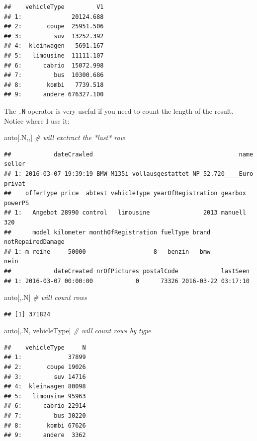 \documentclass[]{book}
\newenvironment{Shaded}{\begin{snugshade}}{\end{snugshade}}
\newcommand{\CommentTok}[1]{\textcolor[rgb]{0.56,0.35,0.01}{\textit{#1}}}
\newcommand{\NormalTok}[1]{#1}
\theoremstyle{definition}
\theoremstyle{definition}
\theoremstyle{definition}
\theoremstyle{remark}
\begin{document}
\begin{verbatim}
##    vehicleType         V1
## 1:              20124.688
## 2:       coupe  25951.506
## 3:         suv  13252.392
## 4:  kleinwagen   5691.167
## 5:   limousine  11111.107
## 6:      cabrio  15072.998
## 7:         bus  10300.686
## 8:       kombi   7739.518
## 9:      andere 676327.100
\end{verbatim}

The \texttt{.N} operator is very useful if you need to count the length of the result.
Notice where I use it:

\begin{Shaded}
\begin{Highlighting}[]
\NormalTok{auto[.N,,] }\CommentTok{# will exctract the *last* row}
\end{Highlighting}
\end{Shaded}

\begin{verbatim}
##            dateCrawled                                         name seller
## 1: 2016-03-07 19:39:19 BMW_M135i_vollausgestattet_NP_52.720____Euro privat
##    offerType price  abtest vehicleType yearOfRegistration gearbox powerPS
## 1:   Angebot 28990 control   limousine               2013 manuell     320
##      model kilometer monthOfRegistration fuelType brand notRepairedDamage
## 1: m_reihe     50000                   8   benzin   bmw              nein
##            dateCreated nrOfPictures postalCode            lastSeen
## 1: 2016-03-07 00:00:00            0      73326 2016-03-22 03:17:10
\end{verbatim}

\begin{Shaded}
\begin{Highlighting}[]
\NormalTok{auto[,.N] }\CommentTok{# will count rows}
\end{Highlighting}
\end{Shaded}

\begin{verbatim}
## [1] 371824
\end{verbatim}

\begin{Shaded}
\begin{Highlighting}[]
\NormalTok{auto[,.N, vehicleType] }\CommentTok{# will count rows by type}
\end{Highlighting}
\end{Shaded}

\begin{verbatim}
##    vehicleType     N
## 1:             37899
## 2:       coupe 19026
## 3:         suv 14716
## 4:  kleinwagen 80098
## 5:   limousine 95963
## 6:      cabrio 22914
## 7:         bus 30220
## 8:       kombi 67626
## 9:      andere  3362
\end{verbatim}
\end{document}
